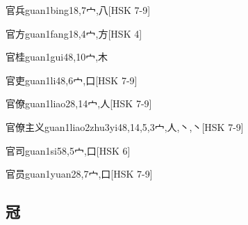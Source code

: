\begin{EntryWithPhonetic}{官兵}{guan1bing1}{8,7}{⼧,⼋}[HSK 7-9]
\end{EntryWithPhonetic}

\begin{EntryWithPhonetic}{官方}{guan1fang1}{8,4}{⼧,⽅}[HSK 4]
\end{EntryWithPhonetic}

\begin{EntryWithPhonetic}{官桂}{guan1gui4}{8,10}{⼧,⽊}
\end{EntryWithPhonetic}

\begin{EntryWithPhonetic}{官吏}{guan1li4}{8,6}{⼧,⼝}[HSK 7-9]
\end{EntryWithPhonetic}

\begin{EntryWithPhonetic}{官僚}{guan1liao2}{8,14}{⼧,⼈}[HSK 7-9]
\end{EntryWithPhonetic}

\begin{EntryWithPhonetic}{官僚主义}{guan1liao2zhu3yi4}{8,14,5,3}{⼧,⼈,⼂,⼂}[HSK 7-9]
\end{EntryWithPhonetic}

\begin{EntryWithPhonetic}{官司}{guan1si5}{8,5}{⼧,⼝}[HSK 6]
\end{EntryWithPhonetic}

\begin{EntryWithPhonetic}{官员}{guan1yuan2}{8,7}{⼧,⼝}[HSK 7-9]
\end{EntryWithPhonetic}

\subsection*{冠}

